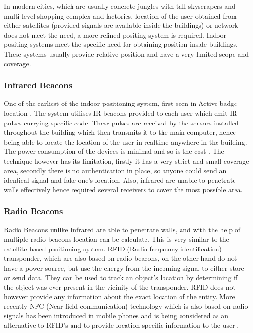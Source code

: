 \documentclass[12pt]{report}
\begin{document}
In modern cities, which are usually concrete jungles with tall skyscrapers and multi-level shopping complex and factories, location of the user obtained from either satellites (provided signals are available inside the buildings) or network does not meet the need, a more refined positing system is required. Indoor positing systems meet the specific need for obtaining position inside buildings. These systems usually provide relative position and have a very limited scope and coverage. 


\subsubsection{Infrared Beacons}
One of the earliest of the indoor positioning system, first seen in Active badge location \cite{want1992active}. The system utilises IR beacons provided to each user which emit IR pulses carrying specific code. These pulses are received by the sensors installed throughout the building which then transmits it to the main computer, hence being able to locate the location of the user in realtime anywhere in the building. The power consumption of the devices is minimal and so is the cost \cite{schiller2004location}. The technique however has its limitation, firstly it has a very strict and small coverage area, secondly there is no authentication in place, so anyone could send an identical signal and fake one's location. Also, infrared are unable to penetrate walls effectively hence required several receivers to cover the most possible area.


\subsubsection{Radio Beacons}
Radio Beacons unlike Infrared are able to penetrate walls, and with the help of multiple radio beacons location can be calculate. This is very similar to the satellite based positioning system. RFID (Radio frequency identification) transponder, which are also based on radio beacons, on the other hand do not have a power source, but use the energy from the incoming signal to either store or send data. They can be used to track an object's location by determining if the object was ever present in the vicinity of the transponder. RFID does not however provide any information about the exact location of the entity. More recently NFC (Near field communication) technology which is also based on radio signals has been introduced in mobile phones and is being considered as an alternative to RFID's and to provide location specific information to the user \cite{siira2009location}.
\end{document}
